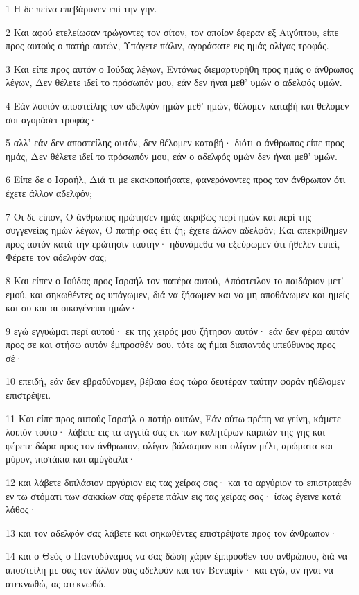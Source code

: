 \par 1 Η δε πείνα επεβάρυνεν επί την γην.
\par 2 Και αφού ετελείωσαν τρώγοντες τον σίτον, τον οποίον έφεραν εξ Αιγύπτου, είπε προς αυτούς ο πατήρ αυτών, Υπάγετε πάλιν, αγοράσατε εις ημάς ολίγας τροφάς.
\par 3 Και είπε προς αυτόν ο Ιούδας λέγων, Εντόνως διεμαρτυρήθη προς ημάς ο άνθρωπος λέγων, Δεν θέλετε ιδεί το πρόσωπόν μου, εάν δεν ήναι μεθ' υμών ο αδελφός υμών.
\par 4 Εάν λοιπόν αποστείλης τον αδελφόν ημών μεθ' ημών, θέλομεν καταβή και θέλομεν σοι αγοράσει τροφάς·
\par 5 αλλ' εάν δεν αποστείλης αυτόν, δεν θέλομεν καταβή· διότι ο άνθρωπος είπε προς ημάς, Δεν θέλετε ιδεί το πρόσωπόν μου, εάν ο αδελφός υμών δεν ήναι μεθ' υμών.
\par 6 Είπε δε ο Ισραήλ, Διά τι με εκακοποιήσατε, φανερόνοντες προς τον άνθρωπον ότι έχετε άλλον αδελφόν;
\par 7 Οι δε είπον, Ο άνθρωπος ηρώτησεν ημάς ακριβώς περί ημών και περί της συγγενείας ημών λέγων, Ο πατήρ σας έτι ζη; έχετε άλλον αδελφόν; Και απεκρίθημεν προς αυτόν κατά την ερώτησιν ταύτην· ηδυνάμεθα να εξεύρωμεν ότι ήθελεν ειπεί, Φέρετε τον αδελφόν σας;
\par 8 Και είπεν ο Ιούδας προς Ισραήλ τον πατέρα αυτού, Απόστειλον το παιδάριον μετ' εμού, και σηκωθέντες ας υπάγωμεν, διά να ζήσωμεν και να μη αποθάνωμεν και ημείς και συ και αι οικογένειαι ημών·
\par 9 εγώ εγγυώμαι περί αυτού· εκ της χειρός μου ζήτησον αυτόν· εάν δεν φέρω αυτόν προς σε και στήσω αυτόν έμπροσθέν σου, τότε ας ήμαι διαπαντός υπεύθυνος προς σέ·
\par 10 επειδή, εάν δεν εβραδύνομεν, βέβαια έως τώρα δευτέραν ταύτην φοράν ηθέλομεν επιστρέψει.
\par 11 Και είπε προς αυτούς Ισραήλ ο πατήρ αυτών, Εάν ούτω πρέπη να γείνη, κάμετε λοιπόν τούτο· λάβετε εις τα αγγείά σας εκ των καλητέρων καρπών της γης και φέρετε δώρα προς τον άνθρωπον, ολίγον βάλσαμον και ολίγον μέλι, αρώματα και μύρον, πιστάκια και αμύγδαλα·
\par 12 και λάβετε διπλάσιον αργύριον εις τας χείρας σας· και το αργύριον το επιστραφέν εν τω στόματι των σακκίων σας φέρετε πάλιν εις τας χείρας σας· ίσως έγεινε κατά λάθος·
\par 13 και τον αδελφόν σας λάβετε και σηκωθέντες επιστρέψατε προς τον άνθρωπον·
\par 14 και ο Θεός ο Παντοδύναμος να σας δώση χάριν έμπροσθεν του ανθρώπου, διά να αποστείλη με σας τον άλλον σας αδελφόν και τον Βενιαμίν· και εγώ, αν ήναι να ατεκνωθώ, ας ατεκνωθώ.
